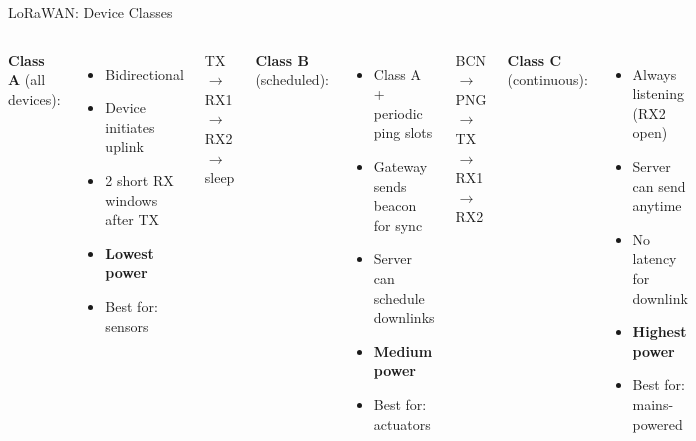 \documentclass[aspectratio=169,11pt]{beamer}
\begin{document}
\begin{frame}{LoRaWAN: Device Classes}
    \begin{columns}
        \textbf{Class A} (all devices):
        \begin{itemize}
            \item Bidirectional
            \item Device initiates uplink
            \item 2 short RX windows after TX
            \item \textbf{Lowest power}
            \item Best for: sensors
        \end{itemize}
        
        \vspace{0.2cm}
        \begin{center}
        \scriptsize
        TX $\rightarrow$ RX1 $\rightarrow$ RX2 $\rightarrow$ sleep
        \normalsize
        \end{center}
        
        \textbf{Class B} (scheduled):
        \begin{itemize}
            \item Class A + periodic ping slots
            \item Gateway sends beacon for sync
            \item Server can schedule downlinks
            \item \textbf{Medium power}
            \item Best for: actuators
        \end{itemize}
        
        \vspace{0.2cm}
        \begin{center}
        \scriptsize
        BCN $\rightarrow$ PNG $\rightarrow$ TX $\rightarrow$ RX1 $\rightarrow$ RX2
        \normalsize
        \end{center}
        
        \textbf{Class C} (continuous):
        \begin{itemize}
            \item Always listening (RX2 open)
            \item Server can send anytime
            \item No latency for downlink
            \item \textbf{Highest power}
            \item Best for: mains-powered
        \end{itemize}
        

\end{columns}
\end{frame}
\end{document}
